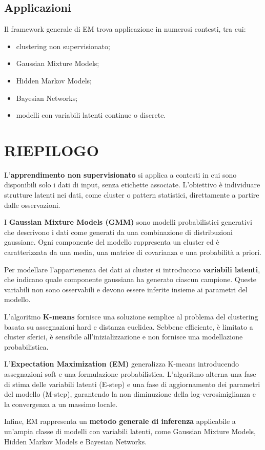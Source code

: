\documentclass[a4paper,12pt]{report}
\begin{document}
\subsection{Applicazioni}

Il framework generale di EM trova applicazione in numerosi contesti, tra cui:
\begin{itemize}
    \item clustering non supervisionato;
    \item Gaussian Mixture Models;
    \item Hidden Markov Models;
    \item Bayesian Networks;
    \item modelli con variabili latenti continue o discrete.
\end{itemize}


\section*{RIEPILOGO}
\begin{tcolorbox}[
    colback=green!5,
    colframe=green!60!black,
    title=\textbf{Unsupervised learning},
    fonttitle=\bfseries,
    coltitle=black,
    boxed title style={
        colback=green!60!black,
        colframe=green!60!black
    }
]

L'\textbf{apprendimento non supervisionato} si applica a contesti in cui sono disponibili solo i dati di input, senza etichette associate. L'obiettivo è individuare strutture latenti nei dati, come cluster o pattern statistici, direttamente a partire dalle osservazioni.

I \textbf{Gaussian Mixture Models (GMM)} sono modelli probabilistici generativi che descrivono i dati come generati da una combinazione di distribuzioni gaussiane. Ogni componente del modello rappresenta un cluster ed è caratterizzata da una media, una matrice di covarianza e una probabilità a priori.

Per modellare l'appartenenza dei dati ai cluster si introducono \textbf{variabili latenti}, che indicano quale componente gaussiana ha generato ciascun campione. Queste variabili non sono osservabili e devono essere inferite insieme ai parametri del modello.

L'algoritmo \textbf{K-means} fornisce una soluzione semplice al problema del clustering basata su assegnazioni hard e distanza euclidea. Sebbene efficiente, è limitato a cluster sferici, è sensibile all'inizializzazione e non fornisce una modellazione probabilistica.

L'\textbf{Expectation Maximization (EM)} generalizza K-means introducendo assegnazioni soft e una formulazione probabilistica. L'algoritmo alterna una fase di stima delle variabili latenti (E-step) e una fase di aggiornamento dei parametri del modello (M-step), garantendo la non diminuzione della log-verosimiglianza e la convergenza a un massimo locale.

Infine, EM rappresenta un \textbf{metodo generale di inferenza} applicabile a un'ampia classe di modelli con variabili latenti, come Gaussian Mixture Models, Hidden Markov Models e Bayesian Networks.

\end{tcolorbox}
\end{document}
